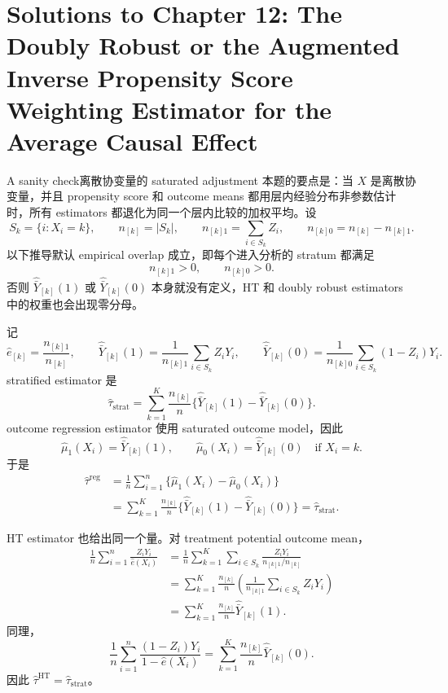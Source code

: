 \chapter{Solutions to Chapter 12: The Doubly Robust or the Augmented Inverse Propensity Score Weighting Estimator for the Average Causal Effect}
\label{sol:chapter12}

\begin{exercisesolution}{A sanity check}{离散协变量的 saturated adjustment}
本题的要点是：当 $X$ 是离散协变量，并且 propensity score 和 outcome means 都用层内经验分布非参数估计时，所有 estimators 都退化为同一个层内比较的加权平均。设
\[
S_k=\{i:X_i=k\},\qquad n_{[k]}=|S_k|,\qquad
n_{[k]1}=\sum_{i\in S_k}Z_i,\qquad n_{[k]0}=n_{[k]}-n_{[k]1}.
\]
以下推导默认 empirical overlap 成立，即每个进入分析的 stratum 都满足
\[
n_{[k]1}>0,\qquad n_{[k]0}>0.
\]
否则 $\hat{\bar Y}_{[k]}(1)$ 或 $\hat{\bar Y}_{[k]}(0)$ 本身就没有定义，HT 和 doubly robust estimators 中的权重也会出现零分母。

记
\[
\hat e_{[k]}=\frac{n_{[k]1}}{n_{[k]}},\qquad
\hat{\bar Y}_{[k]}(1)=\frac{1}{n_{[k]1}}\sum_{i\in S_k}Z_iY_i,\qquad
\hat{\bar Y}_{[k]}(0)=\frac{1}{n_{[k]0}}\sum_{i\in S_k}(1-Z_i)Y_i.
\]
stratified estimator 是
\[
\hat\tau_{\mathrm{strat}}
=\sum_{k=1}^K\frac{n_{[k]}}{n}
\{\hat{\bar Y}_{[k]}(1)-\hat{\bar Y}_{[k]}(0)\}.
\]
outcome regression estimator 使用 saturated outcome model，因此
\[
\hat\mu_1(X_i)=\hat{\bar Y}_{[k]}(1),\qquad
\hat\mu_0(X_i)=\hat{\bar Y}_{[k]}(0)
\quad \text{if }X_i=k.
\]
于是
\begin{align*}
\hat\tau^{\mathrm{reg}}
&=\frac{1}{n}\sum_{i=1}^n\{\hat\mu_1(X_i)-\hat\mu_0(X_i)\} \\
&=\sum_{k=1}^K\frac{n_{[k]}}{n}
\{\hat{\bar Y}_{[k]}(1)-\hat{\bar Y}_{[k]}(0)\}
=\hat\tau_{\mathrm{strat}}.
\end{align*}

HT estimator 也给出同一个量。对 treatment potential outcome mean，
\begin{align*}
\frac{1}{n}\sum_{i=1}^n\frac{Z_iY_i}{\hat e(X_i)}
&=\frac{1}{n}\sum_{k=1}^K
\sum_{i\in S_k}\frac{Z_iY_i}{n_{[k]1}/n_{[k]}} \\
&=\sum_{k=1}^K\frac{n_{[k]}}{n}
\left(\frac{1}{n_{[k]1}}\sum_{i\in S_k}Z_iY_i\right) \\
&=\sum_{k=1}^K\frac{n_{[k]}}{n}\hat{\bar Y}_{[k]}(1).
\end{align*}
同理，
\[
\frac{1}{n}\sum_{i=1}^n\frac{(1-Z_i)Y_i}{1-\hat e(X_i)}
=\sum_{k=1}^K\frac{n_{[k]}}{n}\hat{\bar Y}_{[k]}(0).
\]
因此 $\hat\tau^{\mathrm{HT}}=\hat\tau_{\mathrm{strat}}$。


\end{exercisesolution}
